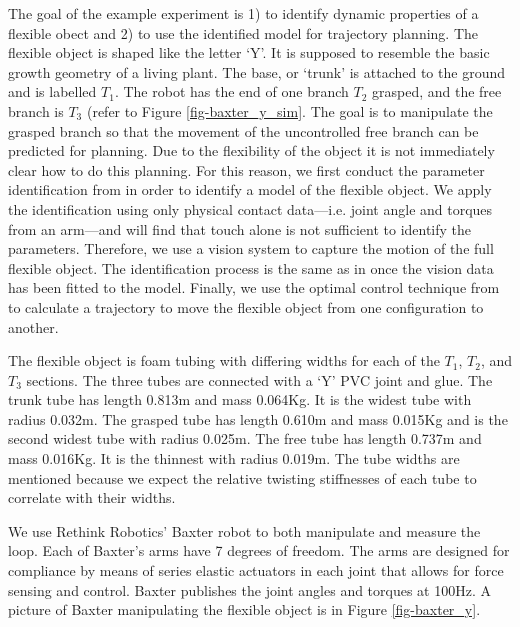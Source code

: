 \documentclass[runningheads,a4paper]{llncs}
\begin{document}
The goal of the example experiment is 1) to identify dynamic properties of a flexible obect and 2) to use the identified model for trajectory planning. The flexible object is shaped like the letter `Y'.  It is supposed to resemble the basic growth geometry of a living plant. The base, or `trunk' is attached to the ground and is labelled $T_1$. The robot has the end of one branch $T_2$ grasped, and the free branch is $T_3$ (refer to Figure \ref{fig-baxter_y_sim}.  The goal is to manipulate the grasped branch so that the movement of the uncontrolled free branch can be predicted for planning.  
Due to the flexibility of the object it is not immediately clear how to do this planning.
For this reason, we first conduct the parameter identification from \cite{caldwell_coleman_correll_iros} in order to identify a model of the flexible object. We apply the identification using only physical contact data---i.e. joint angle and torques from an arm---and will find that touch alone is not sufficient to identify the parameters. Therefore, we use a vision system to capture the motion of the full flexible object. The identification process is the same as in \cite{caldwell_coleman_correll_iros} once the vision data has been fitted to the model.  Finally, we use the optimal control technique from \cite{hauser} to calculate a trajectory to move the flexible object from one configuration to another.

The flexible object is foam tubing with differing widths for each of the $T_1$, $T_2$, and $T_3$ sections. The three tubes are connected with a `Y' PVC joint and glue.  The trunk tube has length 0.813m and mass 0.064Kg. It is the widest tube with radius 0.032m. The grasped tube has length 0.610m and mass 0.015Kg and is the second widest tube with radius 0.025m. The free tube has length 0.737m and mass 0.016Kg. It is the thinnest with radius 0.019m.  The tube widths are mentioned because we expect the relative twisting stiffnesses of each tube to correlate with their widths. 

We use Rethink Robotics' Baxter \cite{guizzo2011rethink} robot to both manipulate and measure the loop.  Each of Baxter's arms have 7 degrees of freedom.  The arms are designed for compliance by means of series elastic actuators in each joint that allows for force sensing and control.  Baxter publishes the joint angles and torques at 100Hz.  A picture of Baxter manipulating the flexible object is in Figure \ref{fig-baxter_y}. 
\end{document}
